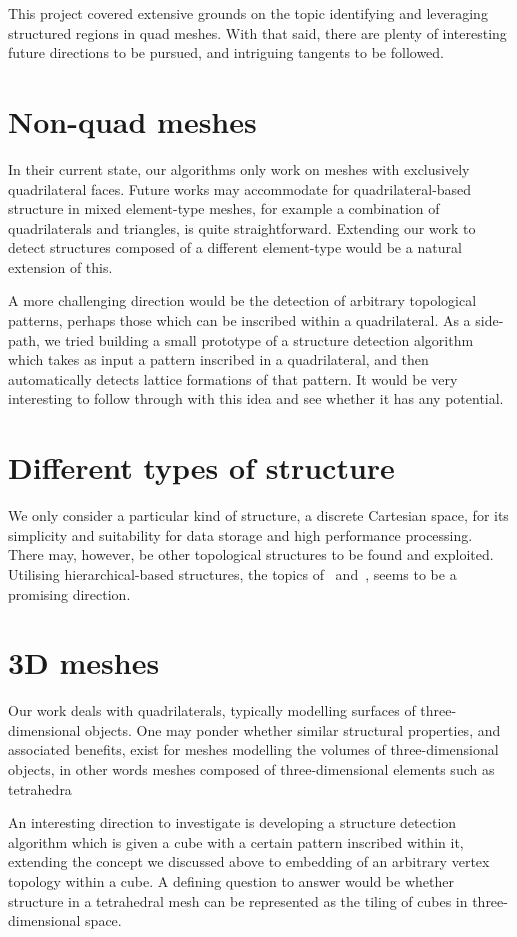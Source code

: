 This project covered extensive grounds on the topic identifying and leveraging structured regions in quad meshes. With that said, there are plenty of interesting future directions to be pursued, and intriguing tangents to be followed.

\section{Non-quad meshes}
In their current state, our algorithms only work on meshes with exclusively quadrilateral faces. Future works may accommodate for quadrilateral-based structure in mixed element-type meshes, for example a combination of quadrilaterals and triangles, is quite straightforward. Extending our work to detect structures composed of a different element-type would be a natural extension of this.

A more challenging direction would be the detection of arbitrary topological patterns, perhaps those which can be inscribed within a quadrilateral. As a side-path, we tried building a small prototype of a structure detection algorithm which takes as input a pattern inscribed in a quadrilateral, and then automatically detects lattice formations of that pattern. It would be very interesting to follow through with this idea and see whether it has any potential.


\section{Different types of structure}
We only consider a particular kind of structure, a discrete Cartesian space, for its simplicity and suitability for data storage and high performance processing. There may, however, be other topological structures to be found and exploited. Utilising hierarchical-based structures, the topics of~\cite{li2004hierarchical} and~\cite{bergen2004hierarchical}, seems to be a promising direction.


\section{3D meshes}
Our work deals with quadrilaterals, typically modelling surfaces of three-dimensional objects. One may ponder whether similar structural properties, and associated benefits, exist for meshes modelling the volumes of three-dimensional objects, in other words meshes composed of three-dimensional elements such as tetrahedra

An interesting direction to investigate is developing a structure detection algorithm which is given a cube with a certain pattern inscribed within it, extending the concept we discussed above to embedding of an arbitrary vertex topology within a cube. A defining question to answer would be whether structure in a tetrahedral mesh can be represented as the tiling of cubes in three-dimensional space.


